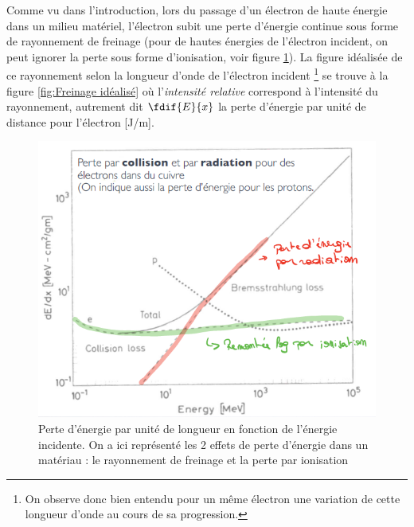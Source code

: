 Comme vu dans l'introduction, lors du passage d'un électron de haute énergie dans un milieu matériel, l'électron subit une perte d'énergie continue sous forme de rayonnement de freinage (pour de hautes énergies de l'électron incident, on peut ignorer la perte sous forme d'ionisation, voir figure \ref{fig:Résumé pertes}). La figure idéalisée de ce rayonnement selon la longueur d'onde de l'électron incident \footnote{On observe donc bien entendu pour un même électron une variation de cette longueur d'onde au cours de sa progression.} se trouve à la figure \ref{fig:Freinage idéalisé} où l'\textit{intensité relative} correspond à l'intensité du rayonnement, autrement dit $\fdif{E}{x}$ la perte d'énergie par unité de distance pour l'électron [J/m].
\begin{figure}[tph]
    \centering
    \includegraphics[scale=0.8]{Images2/RésuméPerte.PNG}
    \caption{Perte d'énergie par unité de longueur en fonction de l'énergie incidente. On a ici représenté les 2 effets de perte d'énergie dans un matériau : le rayonnement de freinage et la perte par ionisation}
    \label{fig:Résumé pertes}
\end{figure}
